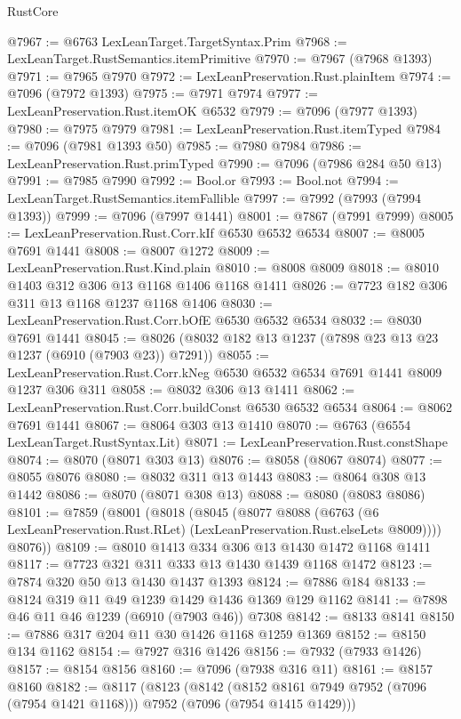\begin{lexlean}{RustCore}
\begin{coremodule}
@7967 := @6763 LexLeanTarget.TargetSyntax.Prim
@7968 := LexLeanTarget.RustSemantics.itemPrimitive
@7970 := @7967 (@7968 @1393)
@7971 := @7965 @7970
@7972 := LexLeanPreservation.Rust.plainItem
@7974 := @7096 (@7972 @1393)
@7975 := @7971 @7974
@7977 := LexLeanPreservation.Rust.itemOK @6532
@7979 := @7096 (@7977 @1393)
@7980 := @7975 @7979
@7981 := LexLeanPreservation.Rust.itemTyped
@7984 := @7096 (@7981 @1393 @50)
@7985 := @7980 @7984
@7986 := LexLeanPreservation.Rust.primTyped
@7990 := @7096 (@7986 @284 @50 @13)
@7991 := @7985 @7990
@7992 := Bool.or
@7993 := Bool.not
@7994 := LexLeanTarget.RustSemantics.itemFallible
@7997 := @7992 (@7993 (@7994 @1393))
@7999 := @7096 (@7997 @1441)
@8001 := @7867 (@7991 @7999)
@8005 := LexLeanPreservation.Rust.Corr.kIf @6530 @6532 @6534
@8007 := @8005 @7691 @1441
@8008 := @8007 @1272
@8009 := LexLeanPreservation.Rust.Kind.plain
@8010 := @8008 @8009
@8018 := @8010 @1403 @312 @306 @13 @1168 @1406 @1168 @1411
@8026 := @7723 @182 @306 @311 @13 @1168 @1237 @1168 @1406
@8030 := LexLeanPreservation.Rust.Corr.bOfE @6530 @6532 @6534
@8032 := @8030 @7691 @1441
@8045 := @8026 (@8032 @182 @13 @1237 (@7898 @23 @13 @23 @1237 (@6910 (@7903 @23)) @7291))
@8055 := LexLeanPreservation.Rust.Corr.kNeg @6530 @6532 @6534 @7691 @1441 @8009 @1237 @306 @311
@8058 := @8032 @306 @13 @1411
@8062 := LexLeanPreservation.Rust.Corr.buildConst @6530 @6532 @6534
@8064 := @8062 @7691 @1441
@8067 := @8064 @303 @13 @1410
@8070 := @6763 (@6554 LexLeanTarget.RustSyntax.Lit)
@8071 := LexLeanPreservation.Rust.constShape
@8074 := @8070 (@8071 @303 @13)
@8076 := @8058 (@8067 @8074)
@8077 := @8055 @8076
@8080 := @8032 @311 @13 @1443
@8083 := @8064 @308 @13 @1442
@8086 := @8070 (@8071 @308 @13)
@8088 := @8080 (@8083 @8086)
@8101 := @7859
    (@8001
      (@8018
        (@8045
          (@8077
            @8088
            (@6763 (@6 LexLeanPreservation.Rust.RLet) (LexLeanPreservation.Rust.elseLets @8009))))
        @8076))
@8109 := @8010 @1413 @334 @306 @13 @1430 @1472 @1168 @1411
@8117 := @7723 @321 @311 @333 @13 @1430 @1439 @1168 @1472
@8123 := @7874 @320 @50 @13 @1430 @1437 @1393
@8124 := @7886 @184
@8133 := @8124 @319 @11 @49 @1239 @1429 @1436 @1369 @129 @1162
@8141 := @7898 @46 @11 @46 @1239 (@6910 (@7903 @46)) @7308
@8142 := @8133 @8141
@8150 := @7886 @317 @204 @11 @30 @1426 @1168 @1259 @1369
@8152 := @8150 @134 @1162
@8154 := @7927 @316 @1426
@8156 := @7932 (@7933 @1426)
@8157 := @8154 @8156
@8160 := @7096 (@7938 @316 @11)
@8161 := @8157 @8160
@8182 := @8117
    (@8123
      (@8142
        (@8152 @8161 @7949 @7952 (@7096 (@7954 @1421 @1168)))
        @7952
        (@7096 (@7954 @1415 @1429)))

\end{coremodule}
\end{lexlean}
